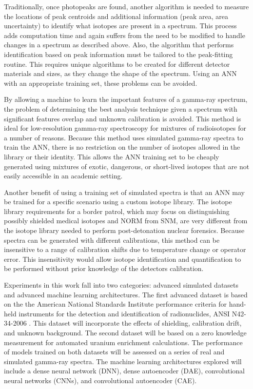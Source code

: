 Traditionally, once photopeaks are found, another algorithm is needed to measure the locations of peak centroids and additional information (peak area, area uncertainty) to identify what isotopes are present in a spectrum. This process adds computation time and again suffers from the need to be modified to handle changes in a spectrum as described above. Also, the algorithm that performs identification based on peak information must be tailored to the peak-fitting routine. This requires unique algorithms to be created for different detector materials and sizes, as they change the shape of the spectrum. Using an ANN with an appropriate training set, these problems can be avoided.

By allowing a machine to learn the important features of a gamma-ray spectrum, the problem of determining the best analysis technique given a spectrum with significant features overlap and unknown calibration is avoided. This method is ideal for low-resolution gamma-ray spectroscopy for mixtures of radioisotopes for a number of reasons. Because this method uses simulated gamma-ray spectra to train the ANN, there is no restriction on the number of isotopes allowed in the library or their identity. This allows the ANN training set to be cheaply generated using mixtures of exotic, dangerous, or short-lived isotopes that are not easily accessible in an academic setting. 

Another benefit of using a training set of simulated spectra is that an ANN may be trained for a specific scenario using a custom isotope library. The isotope library requirements for a border patrol, which may focus on distinguishing possibly shielded medical isotopes and NORM from SNM, are very different from the isotope library needed to perform post-detonation nuclear forensics. Because spectra can be generated with different calibrations, this method can be insensitive to a range of calibration shifts due to temperature change or operator error. This insensitivity would allow isotope identification and quantification to be performed without prior knowledge of the detectors calibration.

Experiments in this work fall into two categories: advanced simulated datasets and advanced machine learning architectures. The first advanced dataset is based on the the American National Standards Institute performance criteria for hand-held instruments for the detection and identification of radionuclides, ANSI N42-34-2006 \cite{ANSI}. This dataset will incorporate the effects of shielding, calibration drift, and unknown background. The second dataset will be based on a zero knowledge measurement for automated uranium enrichment calculations. The performance of models trained on both datasets will be assessed on a series of real and simulated gamma-ray spectra. The machine learning architectures explored will include a dense neural network (DNN), dense autoencoder (DAE), convolutional neural networks (CNNs), and convolutional autoencoder (CAE).